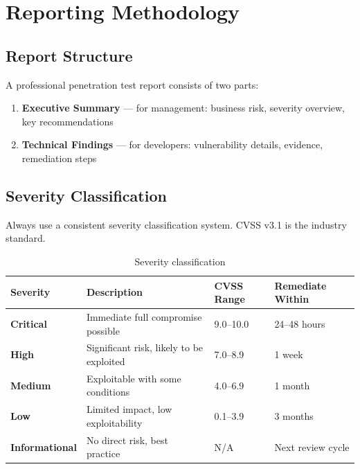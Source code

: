 \chapter{Reporting Methodology}
\label{ch:reporting}


\section{Report Structure}

A professional penetration test report consists of two parts:

\begin{enumerate}
  \item \textbf{Executive Summary} — for management: business risk, severity overview, key recommendations
  \item \textbf{Technical Findings} — for developers: vulnerability details, evidence, remediation steps
\end{enumerate}

\section{Severity Classification}

Always use a consistent severity classification system. CVSS v3.1 is the industry standard.

\begin{table}[H]
\centering
\caption{Severity classification}
\begin{tabularx}{\textwidth}{>{\bfseries}lXll}
\toprule
Severity & Description & CVSS Range & Remediate Within \\
\midrule
Critical & Immediate full compromise possible & 9.0--10.0 & 24--48 hours \\
High & Significant risk, likely to be exploited & 7.0--8.9 & 1 week \\
Medium & Exploitable with some conditions & 4.0--6.9 & 1 month \\
Low & Limited impact, low exploitability & 0.1--3.9 & 3 months \\
Informational & No direct risk, best practice & N/A & Next review cycle \\
\bottomrule
\end{tabularx}
\end{table}

